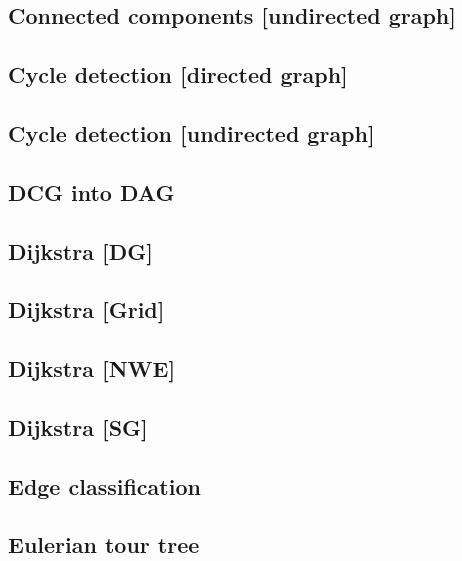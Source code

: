 \subsection{Connected components [undirected graph]}
\raggedbottom
\hrulefill
\subsection{Cycle detection [directed graph]}
\raggedbottom
\hrulefill
\subsection{Cycle detection [undirected graph]}
\raggedbottom
\hrulefill
\subsection{DCG into DAG}
\raggedbottom
\hrulefill
\subsection{Dijkstra [DG]}
\raggedbottom
\hrulefill
\subsection{Dijkstra [Grid]}
\raggedbottom
\hrulefill
\subsection{Dijkstra [NWE]}
\raggedbottom
\hrulefill
\subsection{Dijkstra [SG]}
\raggedbottom
\hrulefill
\subsection{Edge classification}
\raggedbottom
\hrulefill
\subsection{Eulerian tour tree}
\raggedbottom
\hrulefill

